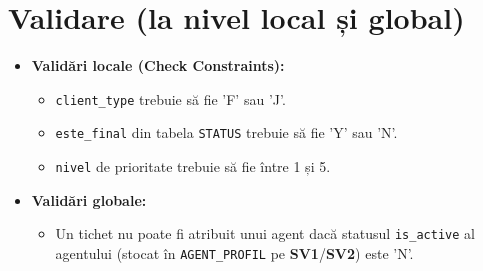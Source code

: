 \documentclass{article}
\begin{document}
\section{Validare (la nivel local și global)}
\begin{itemize}

\item \textbf{Validări locale (Check Constraints):}
\begin{itemize}
\item \texttt{client\_type} trebuie să fie 'F' sau 'J'.
\item \texttt{este_final} din tabela \texttt{STATUS} trebuie să fie 'Y' sau 'N'.
\item \texttt{nivel} de prioritate trebuie să fie între 1 și 5.

\end{itemize}
\item \textbf{Validări globale:}
\begin{itemize}
\item Un tichet nu poate fi atribuit unui agent dacă statusul \texttt{is_active} al agentului (stocat în \texttt{AGENT_PROFIL} pe \textbf{SV1}/\textbf{SV2}) este 'N'.\end{itemize}
\end{itemize}
\end{document}

